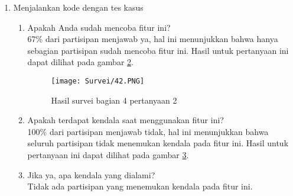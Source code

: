\begin{enumerate}
\begin{enumerate}
        \begin{figure}[H]
        	\centering  
        	\texttt{[image: Survei/34.PNG]}  
        	\caption{Hasil survei bagian 3 pertanyaan 4}
        	\label{fig:5:survei34} 
        \end{figure}
        \item Apakah fitur ini sudah cukup nyaman untuk digunakan? \\ Rata-rata skor untuk pertanyaan ini adalah 3.67, dapat disimpulkan bahwa fitur ini sudah cukup nyaman untuk digunakan. Hasil untuk pertanyaan ini dapat dilihat pada gambar \ref{fig:5:survei34}.
        \item Apakah ada pendapat/saran/masukan untuk fitur ini? \\ Berikut ini adalah masukan yang didapatkan:
        \begin{itemize}
            \item Tidak perlu ada keterangan Save, cukup Execute dan Submit saja
        \end{itemize}
    \end{enumerate}
    \item Menjalankan kode dengan tes kasus
    \begin{enumerate}
        \begin{figure}[H]
        	\centering  
        	\texttt{[image: Survei/41.PNG]}  
        	\caption{Hasil survei bagian 4 pertanyaan 1}
        	\label{fig:5:survei41} 
        \end{figure}
        \item Apakah Anda sudah mencoba fitur ini? \\ 67\% dari partisipan menjawab ya, hal ini menunjukkan bahwa hanya sebagian partisipan sudah mencoba fitur ini. Hasil untuk pertanyaan ini dapat dilihat pada gambar \ref{fig:5:survei41}.
        \begin{figure}[H]
        	\centering  
        	\texttt{[image: Survei/42.PNG]}  
        	\caption{Hasil survei bagian 4 pertanyaan 2}
        	\label{fig:5:survei42} 
        \end{figure}
        \item Apakah terdapat kendala saat menggunakan fitur ini? \\ 100\% dari partisipan menjawab tidak, hal ini menunjukkan bahwa seluruh partisipan tidak menemukan kendala pada fitur ini. Hasil untuk pertanyaan ini dapat dilihat pada gambar \ref{fig:5:survei42}.
        \item Jika ya, apa kendala yang dialami? \\ Tidak ada partisipan yang menemukan kendala pada fitur ini.

\end{enumerate}
\end{enumerate}
